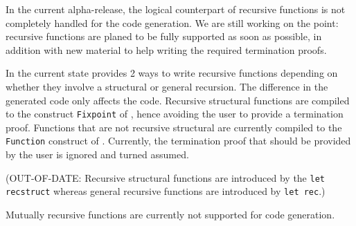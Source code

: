 In the current alpha-release, the logical counterpart of recursive
functions is not completely handled for the {\coq} code generation. We
are still working on the point: recursive functions are planed to be
fully supported as soon as possible, in addition with new material to
help writing the required termination proofs.

In the current state {\focal} provides 2 ways to write recursive
functions depending on whether they involve a structural or general
recursion. The difference in the generated code only affects the
{\coq} code. Recursive structural functions are compiled to the
construct {\tt Fixpoint} of {\coq}, hence avoiding the user to provide a
termination proof. Functions that are not recursive structural are
currently compiled to the {\tt Function} construct of {\coq}. Currently,
the termination proof that should be provided by the user is ignored
and turned assumed.

\medskip
(OUT-OF-DATE:
Recursive structural functions are introduced by the {\tt let recstruct}
whereas general recursive functions are introduced by {\tt let rec}.)

\medskip
Mutually recursive functions are currently not supported for {\coq}
code generation.
